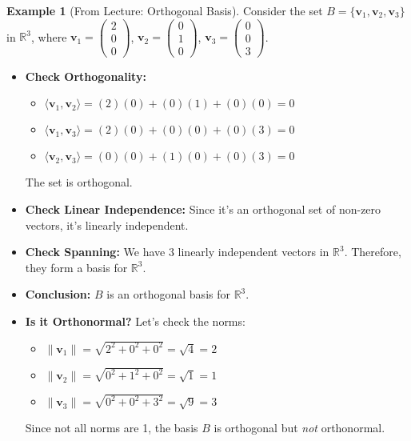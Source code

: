 \documentclass[11pt]{article}
\theoremstyle{definition}
\newtheorem{example}[theorem]{Example}
\theoremstyle{remark}
\newcommand{\R}{\mathbb{R}}
\newcommand{\inner}[2]{\langle #1, #2 \rangle}
\newcommand{\norm}[1]{\| #1 \|}
\begin{document}
\begin{example}[From Lecture: Orthogonal Basis]
Consider the set $B = \{\mathbf{v}_1, \mathbf{v}_2, \mathbf{v}_3\}$ in $\R^3$, where
$\mathbf{v}_1 = \begin{pmatrix} 2 \\ 0 \\ 0 \end{pmatrix}$, $\mathbf{v}_2 = \begin{pmatrix} 0 \\ 1 \\ 0 \end{pmatrix}$, $\mathbf{v}_3 = \begin{pmatrix} 0 \\ 0 \\ 3 \end{pmatrix}$.
\begin{itemize}
    \item \textbf{Check Orthogonality:}
        \begin{itemize}
            \item $\inner{\mathbf{v}_1}{\mathbf{v}_2} = (2)(0) + (0)(1) + (0)(0) = 0$
            \item $\inner{\mathbf{v}_1}{\mathbf{v}_3} = (2)(0) + (0)(0) + (0)(3) = 0$
            \item $\inner{\mathbf{v}_2}{\mathbf{v}_3} = (0)(0) + (1)(0) + (0)(3) = 0$
        \end{itemize}
        The set is orthogonal.
    \item \textbf{Check Linear Independence:} Since it's an orthogonal set of non-zero vectors, it's linearly independent.
    \item \textbf{Check Spanning:} We have 3 linearly independent vectors in $\R^3$. Therefore, they form a basis for $\R^3$.
    \item \textbf{Conclusion:} $B$ is an orthogonal basis for $\R^3$.
    \item \textbf{Is it Orthonormal?} Let's check the norms:
        \begin{itemize}
            \item $\norm{\mathbf{v}_1} = \sqrt{2^2 + 0^2 + 0^2} = \sqrt{4} = 2$
            \item $\norm{\mathbf{v}_2} = \sqrt{0^2 + 1^2 + 0^2} = \sqrt{1} = 1$
            \item $\norm{\mathbf{v}_3} = \sqrt{0^2 + 0^2 + 3^2} = \sqrt{9} = 3$
        \end{itemize}
        Since not all norms are 1, the basis $B$ is orthogonal but \textit{not} orthonormal.

\end{itemize}
\end{example}
\end{document}
